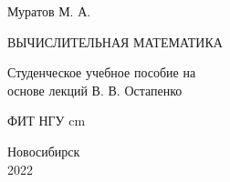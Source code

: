 \documentclass[17pt, a4paper]{extarticle}
\begin{document}
\begin{titlepage}
	\null\vfill

	\begin{center}
		{\large Муратов М. А.}
		\vskip 1cm

		{\huge\MakeUppercase{Вычислительная математика}}
		\vskip 2cm

		{\large Студенческое учебное пособие на\\основе лекций В. В. Остапенко}
	

		\vfill
		\vfill
		ФИТ НГУ
		 cm

		Новосибирск\\2022
	\end{center}
	\hfill
\end{titlepage}
\end{document}
